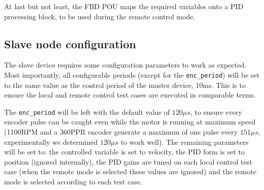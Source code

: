 At last but not least, the FBD POU maps the required variables onto a PID processing block, to be used during the remote control mode.

\subsection{Slave node configuration}
The slave device requires some configuration parameters to work as expected.
Most importantly, all configurable periods (except for the \verb|enc_period|) will be set to the same value as the control period of the master device, 10ms.
This is to ensure the local and remote control test cases are executed in comparable terms.

The \verb|enc_period| will be left with the default value of $120\mu s$, to ensure every encoder pulse can be caught even while the motor is running at maximum speed (1100RPM and a 360PPR encoder generate a maximum of one pulse every $151\mu s$, experimentally we determined $120\mu s$ to work well).
The remaining parameters will be set to: the controlled variable is set to velocity, the PID form is set to position (ignored internally), the PID gains are tuned on each local control test case (when the remote mode is selected these values are ignored) and the remote mode is selected according to each test case.
